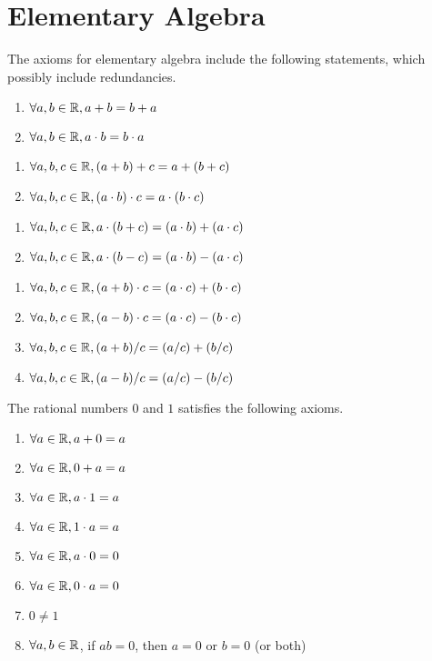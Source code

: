 \chapter{Elementary Algebra}

\M
The axioms for elementary algebra include the following statements,
which possibly include redundancies.

\begin{enumerate}
\item $\forall a,b\in\mathbb{R}, a+b=b+a$
\item $\forall a,b\in\mathbb{R}, a\cdot b=b\cdot a$
\end{enumerate}

\begin{enumerate}[resume*]
\item $\forall a,b,c\in\mathbb{R}, (a+b)+c=a+(b+c)$
\item $\forall a,b,c\in\mathbb{R}, (a\cdot b)\cdot c=a\cdot(b\cdot c)$
\end{enumerate}

\begin{enumerate}[resume*]
\item $\forall a,b,c\in\mathbb{R}, a\cdot(b+c)=(a\cdot b)+(a\cdot c)$
\item $\forall a,b,c\in\mathbb{R}, a\cdot(b-c)=(a\cdot b)-(a\cdot c)$
\end{enumerate}

\begin{enumerate}[resume*]
\item $\forall a,b,c\in\mathbb{R}, (a+b)\cdot c=(a\cdot c)+(b\cdot c)$
\item $\forall a,b,c\in\mathbb{R}, (a-b)\cdot c=(a\cdot c)-(b\cdot c)$
\item $\forall a,b,c\in\mathbb{R}, (a+b)/c=(a/c)+(b/c)$
\item  $\forall a,b,c\in\mathbb{R}, (a-b)/c=(a/c)-(b/c)$
\end{enumerate}

 The rational numbers $0$ and $1$ satisfies the
following axioms.

\begin{enumerate}[resume*]
\item $\forall a\in\mathbb{R}, a+0=a$
\item $\forall a\in\mathbb{R}, 0+a=a$
\item $\forall a\in\mathbb{R}, a\cdot1=a$
\item $\forall a\in\mathbb{R}, 1\cdot a=a$
\item $\forall a\in\mathbb{R}, a\cdot0=0$
\item $\forall a\in\mathbb{R}, 0\cdot a=0$
\item $0\neq1$
\item $\forall a,b\in\mathbb{R}$, if $ab=0$, then $a=0$ or $b=0$ (or both)
\end{enumerate}

